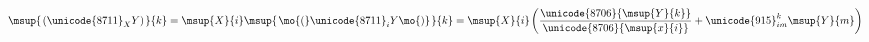 

    \[\let\par\empty

    
{
{\msup{{\left.
\middle(
{{{
\unicode{8711}
}}\sb{{
X
}}}
Y
\middle)
\right.}}{{
k
}}}
=
{\msup{{
X
}}{{
i
}}}
{\msup{{\left.
{\mo{(}}
{{{
\unicode{8711}
}}\sb{{
i
}}}
Y
{\mo{)}}
\right.}}{{
k
}}}
=
{\msup{{
X
}}{{
i
}}}
{\left.
\middle(
{\frac{{
\unicode{8706}
{\msup{{
Y
}}{{
k
}}}
}}{{
\unicode{8706}
{\msup{{
x
}}{{
i
}}}
}}}
+
{{{
\unicode{915}
}}\sb{{
i
m
}}\sp{{
k
}}}
{\msup{{
Y
}}{{
m
}}}
\middle)
\right.}
}


    \]

  